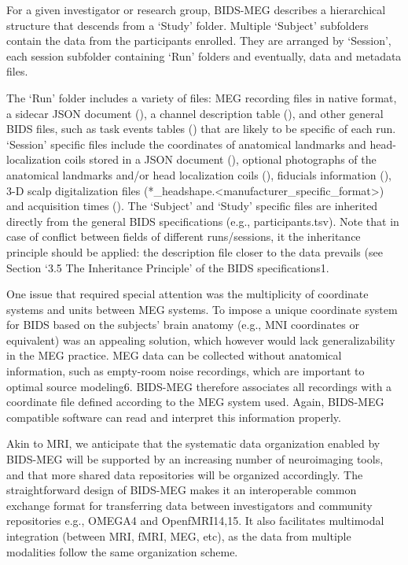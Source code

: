 For a given investigator or research group, BIDS-MEG describes a hierarchical structure that descends from a ‘Study’ folder. Multiple ‘Subject’ subfolders contain the data from the participants enrolled. They are arranged by ‘Session’, each session subfolder containing ‘Run’ folders and eventually, data and metadata files. 

The ‘Run’ folder includes a variety of files: MEG recording files in native format, a sidecar JSON document (), a channel description table (), and other general BIDS files, such as task events tables () that are likely to be specific of each run. ‘Session’ specific files include the coordinates of anatomical landmarks and head-localization coils stored in a JSON document (), optional photographs of the anatomical landmarks and/or head localization coils  (), fiducials information (), 3-D scalp digitalization files (*\_headshape.<manufacturer\_specific\_format>) and acquisition times (). The ‘Subject’ and ‘Study’ specific files are inherited directly from the general BIDS specifications (e.g., participants.tsv). Note that in case of conflict between fields of different runs/sessions, it the inheritance principle should be applied: the description file closer to the data prevails (see Section ‘3.5 The Inheritance Principle’ of the BIDS specifications1.

One issue that required special attention was the multiplicity of coordinate systems and units between MEG systems. To impose a unique coordinate system for BIDS based on the subjects’ brain anatomy (e.g., MNI coordinates or equivalent) was an appealing solution, which however would lack generalizability in the MEG practice. MEG data can be collected without anatomical information, such as empty-room noise recordings, which are important to optimal source modeling6. BIDS-MEG therefore associates all recordings with a coordinate file defined according to the MEG system used. Again, BIDS-MEG compatible software can read and interpret this information properly.

Akin to MRI, we anticipate that the systematic data organization enabled by BIDS-MEG will be supported by an increasing number of neuroimaging tools, and that more shared data repositories will be organized accordingly. The straightforward design of BIDS-MEG makes it an interoperable common exchange format for transferring data between investigators and community repositories e.g., OMEGA4 and OpenfMRI14,15. It also facilitates multimodal integration (between MRI, fMRI, MEG, etc), as the data from multiple modalities follow the same organization scheme.



